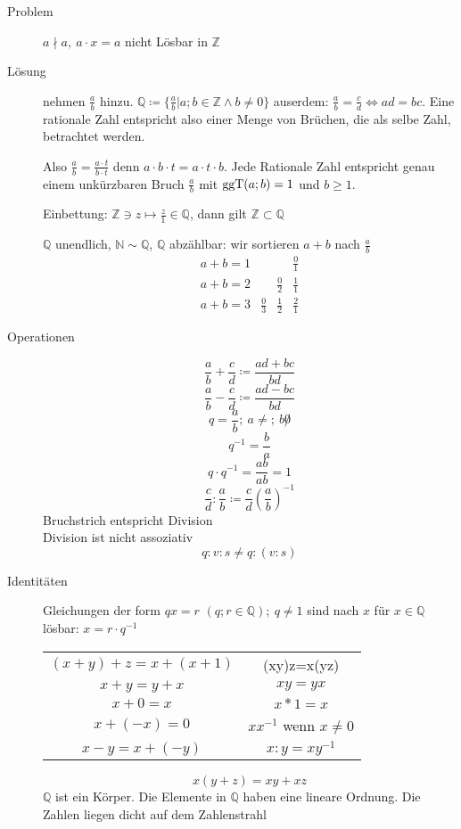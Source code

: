 \begin{description}
    \item[Problem] $a \nmid a,\ a \cdot x = a$ nicht Lösbar in $\mathbb{Z}$
    \item[Lösung] nehmen $\frac{a}{b}$ hinzu. $\mathbb{Q} \coloneqq \lbrace \frac{a}{b} | a;b \in \mathbb{Z} \wedge b \not = 0 \rbrace$ auserdem: $\frac{a}{b} = \frac{c}{d} \Leftrightarrow ad = bc$. Eine rationale Zahl entspricht also einer Menge von Brüchen, die als selbe Zahl, betrachtet werden.

    Also $\frac{a}{b} = \frac{a \cdot t}{b \cdot t}$ denn $a \cdot b \cdot t = a \cdot t \cdot b$. Jede Rationale Zahl entspricht genau einem unkürzbaren Bruch $\frac{a}{b}$ mit $\operatorname{ggT}(a;b) = 1$ und $b \geq 1$.

    Einbettung: $\mathbb{Z}\ni z \longmapsto \frac{z}{1} \in \mathbb{Q}$, dann gilt $\mathbb{Z} \subset \mathbb{Q}$

    $\mathbb{Q}$ unendlich, $\mathbb{N} \sim \mathbb{Q}$, $\mathbb{Q}$ abzählbar: wir sortieren $a + b$ nach $\frac{a}{b}$
    \[\begin{array}{lccc}
          a + b = 1 &             &             & \frac{0}{1} \\
          a + b = 2 &             & \frac{0}{2} & \frac{1}{1} \\
          a + b = 3 & \frac{0}{3} & \frac{1}{2} & \frac{2}{1}
    \end{array}\]
    \item[Operationen]
    \[\frac{a}{b} + \frac{c}{d} \coloneqq \frac{ad+bc}{bd}\]
    \[\frac{a}{b} - \frac{c}{d} \coloneqq \frac{ad-bc}{bd}\]
    \[q = \frac{a}{b};\ a \not =;\ b \not 0\]
    \[q^{-1} = \frac{b}{a}\]
    \[q \cdot q^{-1} = \frac{ab}{ab} = 1\]
    \[\frac{c}{d}:\frac{a}{b}\coloneqq\frac{c}{d}  \left(\frac{a}{b}\right)^{-1}\]
    Bruchstrich entspricht Division \\
    Division ist nicht assoziativ
    \[q:v:s \not = q:(v:s)\]
    \item[Identitäten] Gleichungen der form $qx=r$ $(q;r \in \mathbb{Q});\ q \not = 1$ sind nach $x$ für $x\in \mathbb{Q}$ lösbar: $x = r \cdot q^{-1}$ \\
    \begin{tabular}[t]{cc}
        $(x+y)+z = x+(x+1)$ & (xy)z=x(yz)                 \\
        $x + y = y + x$     & $xy = yx$                   \\
        $x + 0 = x$         & $x * 1 = x$                 \\
        $x + (-x) = 0$      & $xx^{-1}$ wenn $x \not = 0$ \\
        $x - y = x + (-y)$  & $x:y = xy^{-1}$
    \end{tabular}
    \[x(y+z) = xy + xz\]
    $\mathbb{Q}$ ist ein Körper. Die Elemente in $\mathbb{Q}$ haben eine  lineare Ordnung. Die Zahlen liegen dicht auf dem Zahlenstrahl
\end{description}
